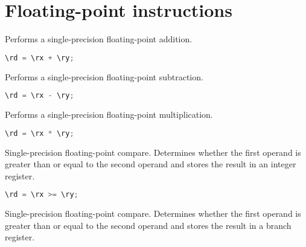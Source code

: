 
\section{Floating-point instructions}

Performs a single-precision floating-point addition.

\begin{lstlisting}[numbers=none, basicstyle=\ttfamily\footnotesize, language=C++]
\rd = \rx + \ry;
\end{lstlisting}

Performs a single-precision floating-point subtraction.

\begin{lstlisting}[numbers=none, basicstyle=\ttfamily\footnotesize, language=C++]
\rd = \rx - \ry;
\end{lstlisting}

Performs a single-precision floating-point multiplication.

\begin{lstlisting}[numbers=none, basicstyle=\ttfamily\footnotesize, language=C++]
\rd = \rx * \ry;
\end{lstlisting}

Single-precision floating-point compare. Determines whether the first operand is greater than or equal to the second operand and stores
the result in an integer register.

\begin{lstlisting}[numbers=none, basicstyle=\ttfamily\footnotesize, language=C++]
\rd = \rx >= \ry;
\end{lstlisting}

Single-precision floating-point compare. Determines whether the first operand is greater than or equal to the second operand and stores
the result in a branch register.


